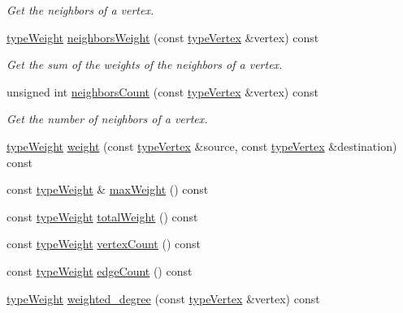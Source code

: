 \begin{DoxyCompactItemize}
\begin{DoxyCompactList}\small\item\em Get the neighbors of a vertex. \end{DoxyCompactList}\item 
\hyperlink{edge_8h_a2e7ea3be891ac8b52f749ec73fee6dd2}{type\+Weight} \hyperlink{classGraphUndirected_a5bc804358a7bc0087953023c597a621b}{neighbors\+Weight} (const \hyperlink{edge_8h_a5fbd20c46956d479cb10afc9855223f6}{type\+Vertex} \&vertex) const
\begin{DoxyCompactList}\small\item\em Get the sum of the weights of the neighbors of a vertex. \end{DoxyCompactList}\item 
unsigned int \hyperlink{classGraphUndirected_a90fdfbabe541262292733703d839812a}{neighbors\+Count} (const \hyperlink{edge_8h_a5fbd20c46956d479cb10afc9855223f6}{type\+Vertex} \&vertex) const
\begin{DoxyCompactList}\small\item\em Get the number of neighbors of a vertex. \end{DoxyCompactList}\item 
\hyperlink{edge_8h_a2e7ea3be891ac8b52f749ec73fee6dd2}{type\+Weight} \hyperlink{classGraphUndirected_ae40d431c92d8b4884c7915c44d42f356}{weight} (const \hyperlink{edge_8h_a5fbd20c46956d479cb10afc9855223f6}{type\+Vertex} \&source, const \hyperlink{edge_8h_a5fbd20c46956d479cb10afc9855223f6}{type\+Vertex} \&destination) const
\item 
const \hyperlink{edge_8h_a2e7ea3be891ac8b52f749ec73fee6dd2}{type\+Weight} \& \hyperlink{classGraphUndirected_a7c21f40748eef95d1c35be892ab10ce2}{max\+Weight} () const
\item 
const \hyperlink{edge_8h_a2e7ea3be891ac8b52f749ec73fee6dd2}{type\+Weight} \hyperlink{classGraphUndirected_a41ba96531c669461dbc7e11ee35796ab}{total\+Weight} () const
\item 
const \hyperlink{edge_8h_a2e7ea3be891ac8b52f749ec73fee6dd2}{type\+Weight} \hyperlink{classGraphUndirected_adf50305970536f71586f8f63462dfcdc}{vertex\+Count} () const
\item 
const \hyperlink{edge_8h_a2e7ea3be891ac8b52f749ec73fee6dd2}{type\+Weight} \hyperlink{classGraphUndirected_acc533831ee3234a03a1cc0037b017a83}{edge\+Count} () const
\item 
\hyperlink{edge_8h_a2e7ea3be891ac8b52f749ec73fee6dd2}{type\+Weight} \hyperlink{classGraphUndirected_ad2b1cd9a6dded42bd5431134aba26612}{weighted\+\_\+degree} (const \hyperlink{edge_8h_a5fbd20c46956d479cb10afc9855223f6}{type\+Vertex} \&vertex) const

\end{DoxyCompactItemize}

